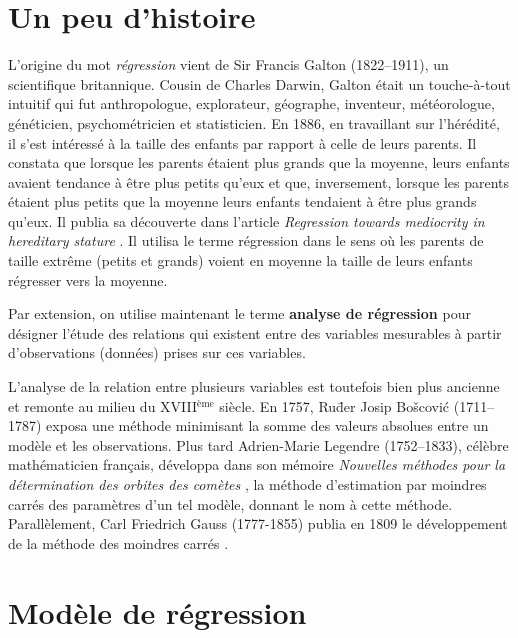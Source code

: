 
\section{Un peu d'histoire}

L'origine du mot \textit{régression} vient de Sir Francis Galton (1822--1911), un scientifique britannique. Cousin de Charles Darwin, Galton était un touche-à-tout intuitif qui fut anthropologue, explorateur, géographe, inventeur, météorologue, généticien, psychométricien et statisticien.
En 1886, en travaillant sur l'hérédité, il s'est intéressé à la taille des enfants par rapport à celle de leurs parents. Il constata que lorsque les parents étaient plus grands que la moyenne, leurs enfants avaient tendance à être plus petits qu'eux et que, inversement, lorsque les parents étaient plus petits que la moyenne leurs enfants tendaient à être plus grands qu'eux. Il publia sa découverte  dans l'article \emph{Regression towards mediocrity in hereditary stature} \citep{Gal:1886}. Il utilisa le terme régression dans le sens où les parents de taille extrême (petits et grands) voient en moyenne la taille de leurs enfants régresser vers la moyenne.

Par extension, on utilise maintenant le terme \textbf{analyse de régression} pour désigner l'étude des relations qui existent entre des variables mesurables à partir d’observations (données) prises sur ces variables.

L'analyse de la relation entre plusieurs variables est toutefois bien plus ancienne et remonte au milieu du XVIII$^\text{ème}$ siècle. En 1757, Ru\=der Josip Bo\v scovi\'c (1711--1787) exposa une méthode minimisant la somme des valeurs absolues entre un modèle et les observations. Plus tard Adrien-Marie Legendre (1752--1833), célèbre mathématicien français, développa dans son mémoire \emph{Nouvelles méthodes pour la détermination des orbites des comètes} \citep{Leg:1805}, la méthode d'estimation par moindres carrés des paramètres d'un tel modèle, donnant le nom à cette méthode. Parallèlement, Carl Friedrich Gauss (1777-1855) publia en 1809 le développement de la méthode des moindres carrés \citep{Gau:1809}.


\section{Modèle de régression}


